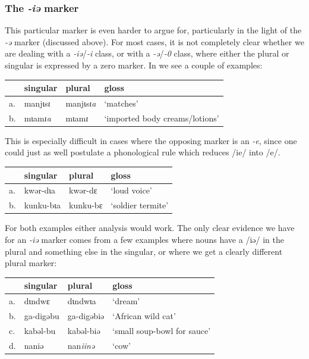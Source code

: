 \subsubsection{The \textit{-iə} marker}

This particular marker is even harder to argue for, particularly in the light of the \textit{-ə} marker (discussed above). For most cases, it is not completely clear whether we are dealing with a \textit{-iə}/\textit{-i} class, or with a \textit{-ə}/\textit{-0} class, where either the plural or singular is expressed by a zero marker. In  we see a couple of examples:

\begin{exe}
    \ex \label{ia-kazem}
    \begin{tabular}[t]{llll}
      & singular & plural   & gloss                          \\
      \midrule
      a. & manjɩs\textit{ɩ}  & manjɩs\textit{ɩa} & `matches'                      \\
      b. & mɩam\textit{ɩa}   & mɩam\textit{ɩ}    & `imported body creams/lotions' \\
    \end{tabular}
\end{exe}

This is especially difficult in cases where the opposing marker is an \textit{-e}, since one could just as well postulate a phonological rule which reduces /ie/ into /e/.

\begin{exe}
    \ex \label{ia2-kazem}
    \begin{tabular}[t]{llll}
      & singular  & plural   & gloss             \\
      \midrule
      a. & kwər-dɩa  & kwər-dɛ  & `loud voice'      \\
      b. & kunku-bɩa & kunku-bɛ & `soldier termite' \\
    \end{tabular}
\end{exe}

For both examples either analysis would work. The only clear evidence we have for an \textit{-iə} marker comes from a few examples where nouns have a /iə/ in the plural and something else in the singular, or where we get a clearly different plural marker:

\begin{exe}
    \ex
    \begin{tabular}[t]{llll}
      & singular  & plural           & gloss                       \\
      \midrule
      a. & dɩndwɛ    & dɩndwɩa          & `dream'                     \\
      b. & ga-digəbu & ga-digəbiə       & `African wild cat'          \\
      c. & kabəl-bu  & kabəl-biə        & `small soup-bowl for sauce' \\
      d. & naniə    & nan\textit{iinə} & `cow'                       \\
    \end{tabular}
\end{exe}

